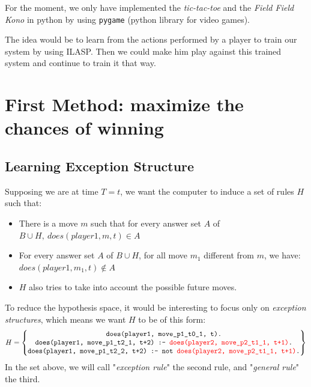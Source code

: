 \documentclass[12pt,twoside]{report}
\begin{document}
% 

For the moment, we only have implemented the \textit{tic-tac-toe} and the \textit{Field Field Kono} in python by using \texttt{pygame} (python library for video games).
\smallskip

The idea would be to learn from the actions performed by a player to train our system by using ILASP. Then we could make him play against this trained system and continue to train it that way.

\section{First Method: maximize the chances of winning}

\subsection{Learning Exception Structure}

Supposing we are at time $T=t$, we want the computer to induce a set of rules $H$ such that:
\begin{itemize}
\item There is a move $m$ such that for every answer set $A$ of $B\cup H,\:  does(player1, m, t)\in A$
\item For every answer set $A$ of $B\cup H$, for all move $m_1$ different from $m$, we have: $does(player1, m_1, t) \notin A$
\item $H$ also tries to take into account the possible future moves.
\end{itemize}

To reduce the hypothesis space, it would be interesting to focus only on \textit{exception structures}, which means we want $H$ to be of this form:
\[H=
\begin{Bmatrix}
\texttt{does(player1, move\_p1\_t0\_1, t).}\\
\texttt{does(player1, move\_p1\_t2\_1, t+2) :- \textcolor{red}{does(player2, move\_p2\_t1\_1, t+1)}.}\\
\texttt{does(player1, move\_p1\_t2\_2, t+2) :- not \textcolor{red}{does(player2, move\_p2\_t1\_1, t+1)}.} 
\end{Bmatrix}
\]
In the set above, we will call "\textit{exception rule}" the second rule, and "\textit{general rule}" the third.
\end{document}
